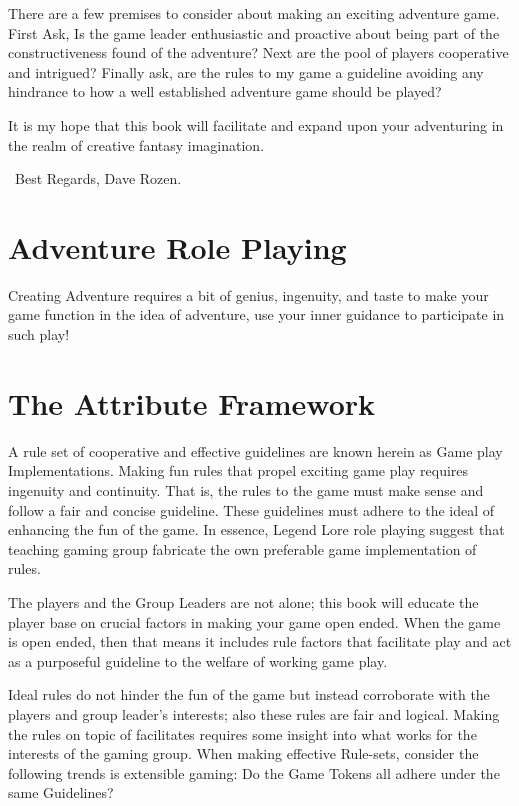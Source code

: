 \documentclass{article}
\begin{document}
There are a few premises to consider about making an exciting adventure game. First Ask, Is the game leader enthusiastic and proactive about being part of the constructiveness found of the adventure? Next are the pool of players cooperative and intrigued? Finally ask, are the rules to my game a guideline avoiding any hindrance to how a well established adventure game should be played?

It is my hope that this book will facilitate and expand upon your adventuring in the realm of creative fantasy imagination.

~Best Regards, Dave Rozen.

\section{Adventure Role Playing}

Creating Adventure requires a bit of genius, ingenuity, and taste to make your game function in the idea of adventure, use your inner guidance to participate in such play!

\section{The Attribute Framework}

A rule set of cooperative and effective guidelines are known herein as Game play Implementations. Making fun rules that propel exciting game play requires ingenuity and continuity. That is, the rules to the game must make sense and follow a fair and concise guideline. These guidelines must adhere to the ideal of enhancing the fun of the game. In essence, Legend Lore role playing suggest that teaching gaming group fabricate the own preferable game implementation of rules.

The players and the Group Leaders are not alone; this book will educate the player base on crucial factors in making your game open ended. When the game is open ended, then that means it includes rule factors that facilitate play and act as a purposeful guideline to the welfare of working game play.

Ideal rules do not hinder the fun of the game but instead corroborate with the players and group leader's interests; also  these rules are fair and logical. Making the rules on topic of facilitates requires some insight into what works for the interests of the gaming group. When making effective Rule-sets, consider the following trends is extensible gaming: Do the Game Tokens all adhere under the same Guidelines?
\end{document}
